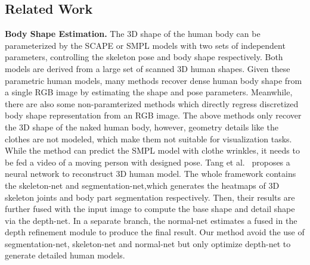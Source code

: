 \documentclass{article} %
\begin{document}





\subsection{Related Work}
\textbf{Body Shape Estimation.} The 3D shape of the human body can be parameterized by the SCAPE or SMPL models with two sets of independent parameters, controlling the skeleton pose and body shape respectively. Both models are derived from a large set of scanned 3D human shapes. Given these parametric human models, many methods recover dense human body shape from a single RGB image by estimating the shape and pose parameters. Meanwhile, there are also some non-paramterized methods which directly regress discretized body shape representation from an RGB image. The above methods only recover the 3D shape of the naked human body, however, geometry details like the clothes are not modeled, which make them not suitable for visualization tasks. While the method can predict the SMPL model with clothe wrinkles, it needs to be fed a video of a moving person with designed pose. Tang et al.~\cite{tang2019neural} proposes a neural network to reconstruct 3D human model. The whole framework contains the skeleton-net and segmentation-net,which generates the heatmaps of 3D skeleton joints and body part segmentation respectively. Then, their results are further fused with the input image to compute the base shape and detail shape via the depth-net. In a separate branch, the normal-net estimates a fused in the depth refinement module to produce the final result. Our method avoid the use of segmentation-net, skeleton-net and normal-net but only optimize depth-net to generate detailed human models.
\end{document}
